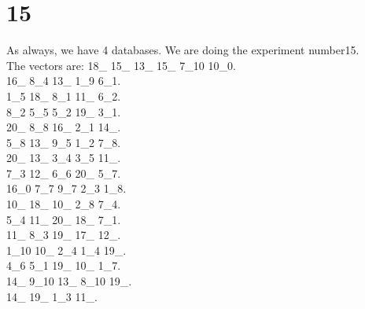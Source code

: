 \chapter{15}
\indent As always, we have 4 databases. We are doing the experiment number15.\\
The vectors are:
18\_ 15\_ 13\_ 15\_ 7\_10 10\_0.\\16\_ 8\_4 13\_ 1\_9 6\_1.\\1\_5 18\_ 8\_1 11\_ 6\_2.\\8\_2 5\_5 5\_2 19\_ 3\_1.\\20\_ 8\_8 16\_ 2\_1 14\_.\\5\_8 13\_ 9\_5 1\_2 7\_8.\\20\_ 13\_ 3\_4 3\_5 11\_.\\7\_3 12\_ 6\_6 20\_ 5\_7.\\16\_0 7\_7 9\_7 2\_3 1\_8.\\10\_ 18\_ 10\_ 2\_8 7\_4.\\5\_4 11\_ 20\_ 18\_ 7\_1.\\11\_ 8\_3 19\_ 17\_ 12\_.\\1\_10 10\_ 2\_4 1\_4 19\_.\\4\_6 5\_1 19\_ 10\_ 1\_7.\\14\_ 9\_10 13\_ 8\_10 19\_.\\14\_ 19\_ 1\_3 11\_.\\